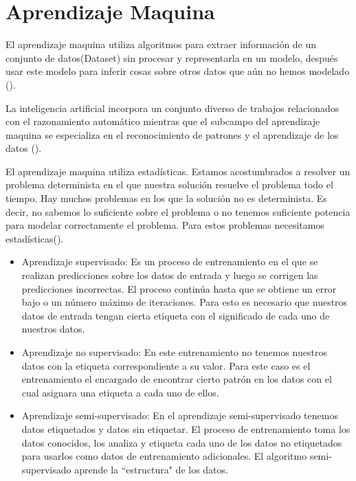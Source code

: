 \section{Aprendizaje Maquina}

El aprendizaje maquina utiliza algoritmos para extraer información de un conjunto de datos(Dataset) sin procesar y representarla en un modelo, después usar este modelo para inferir cosas sobre otros datos que aún no hemos modelado (\cite{patterson2017deep}).

La inteligencia artificial incorpora un conjunto diverso de trabajos relacionados con el razonamiento automático mientras que el subcampo del aprendizaje maquina se especializa en el reconocimiento de patrones y el aprendizaje de los datos (\cite{rosebrock2017deep}).

El aprendizaje maquina utiliza estadísticas. Estamos acostumbrados a resolver un problema determinista en el que nuestra solución resuelve el problema todo el tiempo. Hay muchos problemas en los que la solución no es determinista. Es decir, no sabemos lo suficiente sobre el problema o no tenemos suficiente potencia para modelar correctamente el problema. Para estos problemas necesitamos estadísticas(\cite{harrington2012Machine}).

\begin{itemize}

\item Aprendizaje supervisado: Es un proceso de entrenamiento en el que se realizan predicciones sobre los datos de entrada y luego se corrigen las predicciones incorrectas. El proceso continúa hasta que se obtiene un error bajo o un número máximo de iteraciones. Para esto es necesario que nuestros datos de entrada tengan cierta etiqueta con el significado de cada uno de nuestros datos.

\item Aprendizaje no supervisado: En este entrenamiento no tenemos nuestros datos con la etiqueta correspondiente a su valor. Para este caso es el entrenamiento el encargado de encontrar cierto patrón en los datos con el cual asignara una etiqueta a cada uno de ellos.

\item Aprendizaje semi-supervisado: En el aprendizaje semi-supervisado tenemos datos etiquetados y datos sin etiquetar. El proceso de entrenamiento toma los datos conocidos, los analiza y etiqueta cada uno de los datos no etiquetados para usarlos como datos de entrenamiento adicionales. El algoritmo semi-supervisado aprende la ``estructura" de los datos.

\end{itemize}


